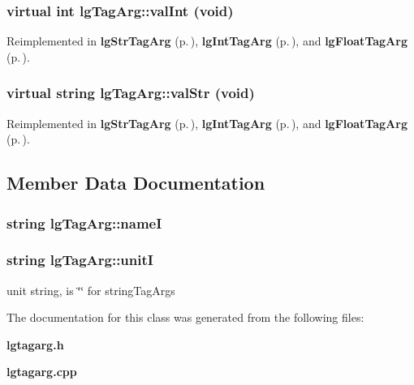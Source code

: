 \subsubsection{\setlength{\rightskip}{0pt plus 5cm}virtual int lg\-Tag\-Arg::val\-Int (void)\hspace{0.3cm}{\tt  [inline, virtual]}}\label{classlgTagArg_a4}




Reimplemented in {\bf lg\-Str\-Tag\-Arg} {\rm (p.\,\pageref{classlgStrTagArg_a4})}, {\bf lg\-Int\-Tag\-Arg} {\rm (p.\,\pageref{classlgIntTagArg_a2})}, and {\bf lg\-Float\-Tag\-Arg} {\rm (p.\,\pageref{classlgFloatTagArg_a4})}.
\subsubsection{\setlength{\rightskip}{0pt plus 5cm}virtual string lg\-Tag\-Arg::val\-Str (void)\hspace{0.3cm}{\tt  [inline, virtual]}}\label{classlgTagArg_a3}




Reimplemented in {\bf lg\-Str\-Tag\-Arg} {\rm (p.\,\pageref{classlgStrTagArg_a3})}, {\bf lg\-Int\-Tag\-Arg} {\rm (p.\,\pageref{classlgIntTagArg_a4})}, and {\bf lg\-Float\-Tag\-Arg} {\rm (p.\,\pageref{classlgFloatTagArg_a3})}.

\subsection{Member Data Documentation}
\subsubsection{\setlength{\rightskip}{0pt plus 5cm}string {\bf lg\-Tag\-Arg::name\-I}\hspace{0.3cm}{\tt  [private]}}\label{classlgTagArg_r0}


\subsubsection{\setlength{\rightskip}{0pt plus 5cm}string {\bf lg\-Tag\-Arg::unit\-I}\hspace{0.3cm}{\tt  [protected]}}\label{classlgTagArg_p0}


unit string, is \char`\"{}\char`\"{} for string\-Tag\-Args 



The documentation for this class was generated from the following files:\begin{CompactItemize}
\item 
{\bf lgtagarg.h}\item 
{\bf lgtagarg.cpp}\end{CompactItemize}
